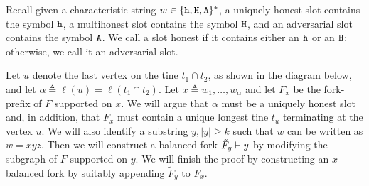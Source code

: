   Recall given a characteristic string $w \in \{\mathtt{h}, \mathtt{H}, \mathtt{A}\}^*$, 
  a uniquely honest slot contains the symbol $\mathtt{h}$, 
  a multihonest slot contains the symbol $\mathtt{H}$, 
  and an adversarial slot contains the symbol $\mathtt{A}$.
  We call a slot honest if it contains either an $\mathtt{h}$ or an $\mathtt{H}$; 
  otherwise, we call it an adversarial slot. 

  Let $u$ denote the last vertex on the tine
  $t_1 \cap t_2$, as shown in the diagram below, and let
  $\alpha \triangleq \ell(u) = \ell(t_1 \cap t_2)$. 
  Let $x \triangleq w_1, \ldots, w_\alpha$ 
  and let $F_x$ be the fork-prefix of $F$ supported on $x$. 
  We will argue that $\alpha$ must be a uniquely honest slot and, 
  in addition, that 
  $F_x$ must contain a unique longest tine $t_u$ terminating 
  at the vertex $u$. 
  We will also identify a substring 
  $y, |y| \geq k$ 
  such that $w$ can be written as $w = xyz$. 
  Then we will construct a balanced fork $\tilde{F}_y \vdash y$ by 
  modifying the subgraph of $F$ supported on $y$. 
  We will finish the proof by constructing an $x$-balanced fork by 
  suitably appending $\tilde{F}_y$ to $F_x$.
    
  \begin{center}
    \end{center}

